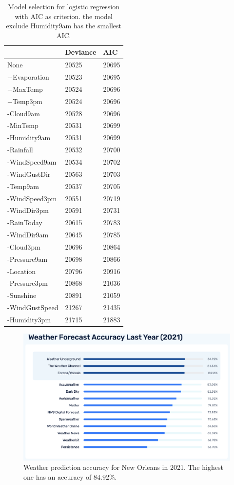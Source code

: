 \documentclass[11pt, a4paper, jou]{apa7}
\begin{document}
\begin{table}[p]
    \centering
    \caption{Model selection for logistic regression with AIC as criterion. the model exclude Humidity9am has the smallest AIC. }
    \label{tab:model_selection_aic}
    \begin{tabular}{lll}
    \hline
                   & Deviance & AIC   \\ \hline
    None           & 20525    & 20695 \\
    +Evaporation   & 20523    & 20695 \\
    +MaxTemp       & 20524    & 20696 \\
    +Temp3pm       & 20524    & 20696 \\
    -Cloud9am      & 20528    & 20696 \\
    -MinTemp       & 20531    & 20699 \\
    -Humidity9am   & 20531    & 20699 \\
    -Rainfall      & 20532    & 20700 \\
    -WindSpeed9am  & 20534    & 20702 \\
    -WindGustDir   & 20563    & 20703 \\
    -Temp9am       & 20537    & 20705 \\
    -WindSpeed3pm  & 20551    & 20719 \\
    -WindDir3pm    & 20591    & 20731 \\
    -RainToday     & 20615    & 20783 \\
    -WindDir9am    & 20645    & 20785 \\
    -Cloud3pm      & 20696    & 20864 \\
    -Pressure9am   & 20698    & 20866 \\
    -Location      & 20796    & 20916 \\
    -Pressure3pm   & 20868    & 21036 \\
    -Sunshine      & 20891    & 21059 \\
    -WindGustSpeed & 21267    & 21435 \\
    -Humidity3pm   & 21715    & 21883 \\ \hline
    \end{tabular}
    \end{table}


\begin{figure}[p]
    \centering
    \caption{Weather prediction accuracy for New Orleans in 2021. The highest one has an accuracy of $84.92\%$. }\label{fig:weather_prediction_nola}
    \includegraphics[width=.55\textwidth]{figures/Weather2021.png}
\end{figure}
\end{document}
